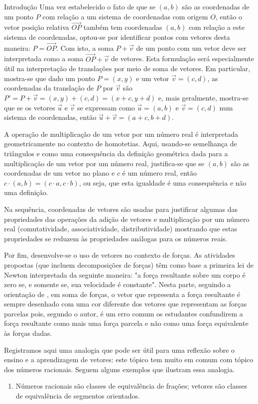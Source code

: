 \begin{apresentacao}{Introdução}
Uma vez estabelecido o fato de que se \((a, b)\) são as coordenadas de um ponto \(P\) com relação a um sistema de coordenadas com origem \(O\), então o vetor posição relativa \(\overrightarrow{OP}\) também tem coordenadas \((a, b)\) com relação a este sistema de coordenadas, optou-se por identificar pontos com vetores desta maneira: \(P = \overrightarrow{OP}\). Com isto, a soma \(P + \vec{v}\) de um ponto com um vetor deve ser interpretada como a soma \(\vec{OP} + \vec{v}\) de vetores. Esta formulação será especialmente útil na interpretação de translações por meio de soma de vetores. Em particular, mostra-se que dado um ponto \(P=(x,y)\) e um vetor \(\vec{v}=(c,d)\), as coordenadas da translação de \(P\) por \(\vec{v}\) são \(P'=P+\vec{v} = (x,y) + (c,d) = (x+c,y+d)\) e, mais geralmente, mostra-se que se os vetores \(\vec{u}\) e \(\vec{v}\) se expressam como \(\vec{u}=(a,b)\) e  \(\vec{v} = (c, d)\) num sistema de coordenadas, então \(\vec{u} + \vec{v} = (a + c, b + d)\).

A operação de multiplicação de um vetor por um número real é interpretada geometricamente no contexto de homotetias. Aqui, usando-se semelhança de triângulos e como uma consequência da definição geométrica dada para a multiplicação de um vetor por um número real, justifica-se que se \((a, b)\) são as coordenadas de um vetor no plano e \(c\) é um número real, então \(c \cdot (a, b) = (c \cdot a, c \cdot b)\), ou seja, que esta igualdade é uma consequência e não uma definição.

Na sequência, coordenadas de vetores são usadas para justificar algumas das propriedades das operações da adição de vetores e multiplicação por um número real (comutatividade, associatividade, distributividade) mostrando que estas propriedades se reduzem às propriedades análogas para os números reais.

Por fim, desenvolve-se o uso de vetores no contexto de forças. As atividades propostas (que incluem decomposições de forças) têm como base a primeira lei de Newton interpretada da seguinte maneira: "a força resultante sobre um corpo é zero se, e somente se, sua velocidade é constante". Nesta parte, seguindo a orientação de \citet{roche1997}, em soma de forças, o vetor que representa a força resultante é sempre desenhado com uma cor diferente dos vetores que representam as forças parcelas pois, segundo o autor, é um erro comum os estudantes confundirem a força resultante como mais uma força parcela e não como uma força equivalente às forças dadas.

Registramos aqui uma analogia que pode ser útil para uma reflexão sobre o ensino e a aprendizagem de vetores: este tópico tem muito em comum com tópico dos números racionais. Seguem alguns exemplos que ilustram essa analogia.
\begin{enumerate}
\item {} 
Números racionais são classes de equivalência de frações;  vetores são classes de equivalência de segmentos orientados.


\end{enumerate}
\end{apresentacao}
